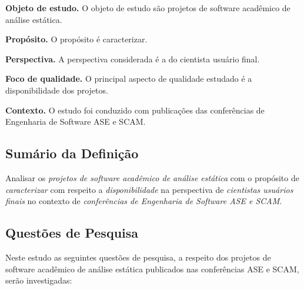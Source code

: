 \begin{description}
  \item{\bf Objeto de estudo.}
     O objeto de estudo são projetos de software acadêmico de análise estática.
  \item{\bf Propósito.}
    O propósito é caracterizar.
  \item{\bf Perspectiva.}
    A perspectiva considerada é a do cientista usuário final.
  \item{\bf Foco de qualidade.}
    O principal aspecto de qualidade estudado é a disponibilidade dos projetos.
  \item{\bf Contexto.}
    O estudo foi conduzido com publicações das conferências de Engenharia de Software ASE e SCAM.
\end{description}

\subsection{Sumário da Definição}

Analisar os \textit{projetos de software acadêmico de análise estática}
com o propósito de \textit{caracterizar}
com respeito a \textit{disponibilidade}
na perspectiva de \textit{cientistas usuários finais}
no contexto de \textit{conferências de Engenharia de Software ASE e SCAM}.

\subsection{Questões de Pesquisa}

Neste estudo as seguintes questões de pesquisa, a respeito dos projetos de
software acadêmico de análise estática publicados nas conferências ASE e SCAM,
serão investigadas:

\newcommand{\EstudoUmQuestaoUm}{
  Os projetos de software acadêmico de análise estática publicados nas conferências ASE e SCAM possuem alguma presença oficial online?
}
\newcommand{\EstudoUmQuestaoDois}{
  Os projetos de software academico de análise estática publicados nas conferências ASE e SCAM estão disponíveis para download?
}
\newcommand{\EstudoUmQuestaoTres}{
  É possível ter acesso ao código fonte dos projetos de software de análise estática publicados nas conferências ASE e SCAM?
}
\newcommand{\EstudoUmQuestaoQuatro}{
  Os projetos de software com código fonte disponível podem ser adaptados para atender necessidades emergentes?
}

